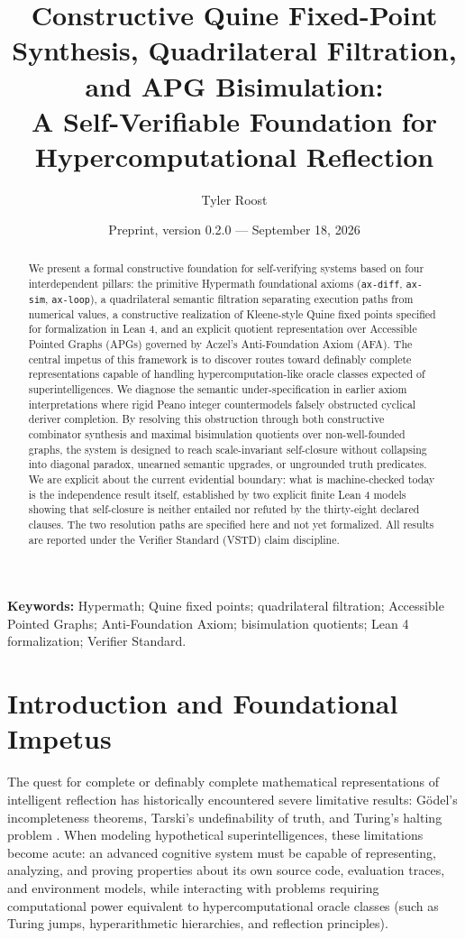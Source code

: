\documentclass[11pt]{article}
\title{Constructive Quine Fixed-Point Synthesis, Quadrilateral Filtration, and APG Bisimulation:\\A Self-Verifiable Foundation for Hypercomputational Reflection}
\author{Tyler Roost}
\date{Preprint, version 0.2.0 --- September 18, 2026}
\theoremstyle{definition}
\begin{document}
\maketitle

\begin{abstract}
We present a formal constructive foundation for self-verifying systems based on four interdependent pillars: the primitive Hypermath foundational axioms (\texttt{ax-diff}, \texttt{ax-sim}, \texttt{ax-loop}), a quadrilateral semantic filtration separating execution paths from numerical values, a constructive realization of Kleene-style Quine fixed points specified for formalization in Lean 4, and an explicit quotient representation over Accessible Pointed Graphs (APGs) governed by Aczel's Anti-Foundation Axiom (AFA). The central impetus of this framework is to discover routes toward definably complete representations capable of handling hypercomputation-like oracle classes expected of superintelligences. We diagnose the semantic under-specification in earlier axiom interpretations where rigid Peano integer countermodels falsely obstructed cyclical deriver completion. By resolving this obstruction through both constructive combinator synthesis and maximal bisimulation quotients over non-well-founded graphs, the system is designed to reach scale-invariant self-closure without collapsing into diagonal paradox, unearned semantic upgrades, or ungrounded truth predicates. We are explicit about the current evidential boundary: what is machine-checked today is the independence result itself, established by two explicit finite Lean 4 models showing that self-closure is neither entailed nor refuted by the thirty-eight declared clauses. The two resolution paths are specified here and not yet formalized. All results are reported under the Verifier Standard (VSTD) claim discipline.
\end{abstract}

\noindent\textbf{Keywords:} Hypermath; Quine fixed points; quadrilateral filtration; Accessible Pointed Graphs; Anti-Foundation Axiom; bisimulation quotients; Lean 4 formalization; Verifier Standard.

\section{Introduction and Foundational Impetus}
The quest for complete or definably complete mathematical representations of intelligent reflection has historically encountered severe limitative results: Gödel's incompleteness theorems, Tarski's undefinability of truth, and Turing's halting problem \cite{tarski,kleene}. When modeling hypothetical superintelligences, these limitations become acute: an advanced cognitive system must be capable of representing, analyzing, and proving properties about its own source code, evaluation traces, and environment models, while interacting with problems requiring computational power equivalent to hypercomputational oracle classes (such as Turing jumps, hyperarithmetic hierarchies, and reflection principles).
\end{document}

